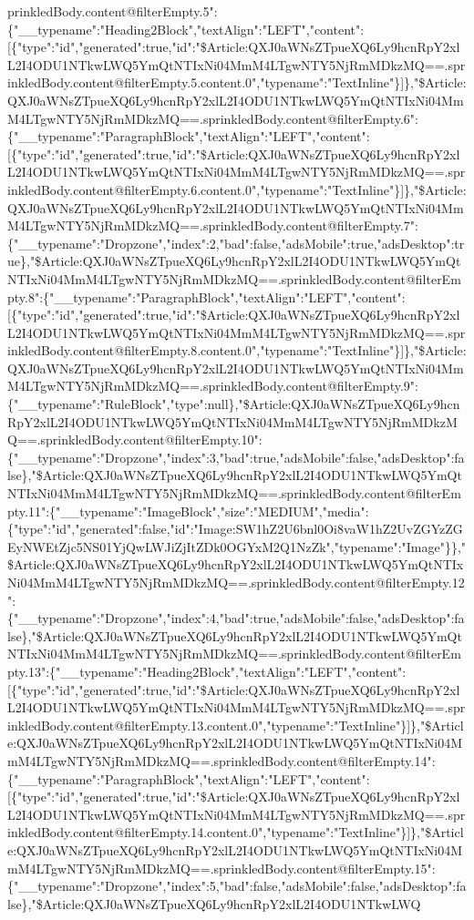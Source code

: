 prinkledBody.content@filterEmpty.5":\{"\_\_typename":"Heading2Block","textAlign":"LEFT","content":{[}\{"type":"id","generated":true,"id":"\$Article:QXJ0aWNsZTpueXQ6Ly9hcnRpY2xlL2I4ODU1NTkwLWQ5YmQtNTIxNi04MmM4LTgwNTY5NjRmMDkzMQ==.sprinkledBody.content@filterEmpty.5.content.0","typename":"TextInline"\}{]}\},"\$Article:QXJ0aWNsZTpueXQ6Ly9hcnRpY2xlL2I4ODU1NTkwLWQ5YmQtNTIxNi04MmM4LTgwNTY5NjRmMDkzMQ==.sprinkledBody.content@filterEmpty.6":\{"\_\_typename":"ParagraphBlock","textAlign":"LEFT","content":{[}\{"type":"id","generated":true,"id":"\$Article:QXJ0aWNsZTpueXQ6Ly9hcnRpY2xlL2I4ODU1NTkwLWQ5YmQtNTIxNi04MmM4LTgwNTY5NjRmMDkzMQ==.sprinkledBody.content@filterEmpty.6.content.0","typename":"TextInline"\}{]}\},"\$Article:QXJ0aWNsZTpueXQ6Ly9hcnRpY2xlL2I4ODU1NTkwLWQ5YmQtNTIxNi04MmM4LTgwNTY5NjRmMDkzMQ==.sprinkledBody.content@filterEmpty.7":\{"\_\_typename":"Dropzone","index":2,"bad":false,"adsMobile":true,"adsDesktop":true\},"\$Article:QXJ0aWNsZTpueXQ6Ly9hcnRpY2xlL2I4ODU1NTkwLWQ5YmQtNTIxNi04MmM4LTgwNTY5NjRmMDkzMQ==.sprinkledBody.content@filterEmpty.8":\{"\_\_typename":"ParagraphBlock","textAlign":"LEFT","content":{[}\{"type":"id","generated":true,"id":"\$Article:QXJ0aWNsZTpueXQ6Ly9hcnRpY2xlL2I4ODU1NTkwLWQ5YmQtNTIxNi04MmM4LTgwNTY5NjRmMDkzMQ==.sprinkledBody.content@filterEmpty.8.content.0","typename":"TextInline"\}{]}\},"\$Article:QXJ0aWNsZTpueXQ6Ly9hcnRpY2xlL2I4ODU1NTkwLWQ5YmQtNTIxNi04MmM4LTgwNTY5NjRmMDkzMQ==.sprinkledBody.content@filterEmpty.9":\{"\_\_typename":"RuleBlock","type":null\},"\$Article:QXJ0aWNsZTpueXQ6Ly9hcnRpY2xlL2I4ODU1NTkwLWQ5YmQtNTIxNi04MmM4LTgwNTY5NjRmMDkzMQ==.sprinkledBody.content@filterEmpty.10":\{"\_\_typename":"Dropzone","index":3,"bad":true,"adsMobile":false,"adsDesktop":false\},"\$Article:QXJ0aWNsZTpueXQ6Ly9hcnRpY2xlL2I4ODU1NTkwLWQ5YmQtNTIxNi04MmM4LTgwNTY5NjRmMDkzMQ==.sprinkledBody.content@filterEmpty.11":\{"\_\_typename":"ImageBlock","size":"MEDIUM","media":\{"type":"id","generated":false,"id":"Image:SW1hZ2U6bnl0Oi8vaW1hZ2UvZGYzZGEyNWEtZjc5NS01YjQwLWJiZjItZDk0OGYxM2Q1NzZk","typename":"Image"\}\},"\$Article:QXJ0aWNsZTpueXQ6Ly9hcnRpY2xlL2I4ODU1NTkwLWQ5YmQtNTIxNi04MmM4LTgwNTY5NjRmMDkzMQ==.sprinkledBody.content@filterEmpty.12":\{"\_\_typename":"Dropzone","index":4,"bad":true,"adsMobile":false,"adsDesktop":false\},"\$Article:QXJ0aWNsZTpueXQ6Ly9hcnRpY2xlL2I4ODU1NTkwLWQ5YmQtNTIxNi04MmM4LTgwNTY5NjRmMDkzMQ==.sprinkledBody.content@filterEmpty.13":\{"\_\_typename":"Heading2Block","textAlign":"LEFT","content":{[}\{"type":"id","generated":true,"id":"\$Article:QXJ0aWNsZTpueXQ6Ly9hcnRpY2xlL2I4ODU1NTkwLWQ5YmQtNTIxNi04MmM4LTgwNTY5NjRmMDkzMQ==.sprinkledBody.content@filterEmpty.13.content.0","typename":"TextInline"\}{]}\},"\$Article:QXJ0aWNsZTpueXQ6Ly9hcnRpY2xlL2I4ODU1NTkwLWQ5YmQtNTIxNi04MmM4LTgwNTY5NjRmMDkzMQ==.sprinkledBody.content@filterEmpty.14":\{"\_\_typename":"ParagraphBlock","textAlign":"LEFT","content":{[}\{"type":"id","generated":true,"id":"\$Article:QXJ0aWNsZTpueXQ6Ly9hcnRpY2xlL2I4ODU1NTkwLWQ5YmQtNTIxNi04MmM4LTgwNTY5NjRmMDkzMQ==.sprinkledBody.content@filterEmpty.14.content.0","typename":"TextInline"\}{]}\},"\$Article:QXJ0aWNsZTpueXQ6Ly9hcnRpY2xlL2I4ODU1NTkwLWQ5YmQtNTIxNi04MmM4LTgwNTY5NjRmMDkzMQ==.sprinkledBody.content@filterEmpty.15":\{"\_\_typename":"Dropzone","index":5,"bad":false,"adsMobile":false,"adsDesktop":false\},"\$Article:QXJ0aWNsZTpueXQ6Ly9hcnRpY2xlL2I4ODU1NTkwLWQ